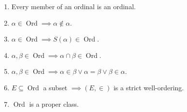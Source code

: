 \documentclass[notoc,notitlepage]{tufte-book}
\DeclareMathOperator{\Ord}{Ord }
\begin{document}
\begin{propo}
\label{propo:properties_of_ordinals}
  \begin{enumerate}
    \item Every member of an ordinal is an ordinal.\label{item:properties_of_ordinals_1}
    \item $\alpha \in \Ord \implies \alpha \notin \alpha$.\label{item:properties_of_ordinals_2}
    \item $\alpha \in \Ord \implies S(\alpha) \in \Ord$.\label{item:properties_of_ordinals_3}
    \item $\alpha, \beta \in \Ord \implies \alpha \cap \beta \in \Ord$.\label{item:properties_of_ordinals_4}
    \item $\alpha, \beta \in \Ord \implies \alpha \in \beta \lor \alpha = \beta \lor \beta \in \alpha$.\label{item:properties_of_ordinals_5}
    \item $E \subseteq \Ord$ a subset $\implies (E, \in)$ is a strict well-ordering.\label{item:properties_of_ordinals_6}
    \item $\Ord$ is a proper class.\label{item:properties_of_ordinals_7}
  \end{enumerate}
\end{propo}
\end{document}
